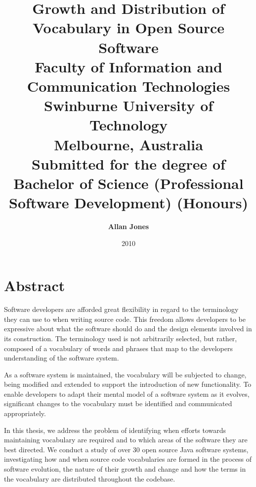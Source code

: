 \title{ \huge{\textbf{Growth and Distribution of Vocabulary in Open Source Software}} \\[1.2cm]
\large{Faculty of Information and Communication Technologies\\
Swinburne University of Technology\\
Melbourne, Australia\\}
\vspace{1.2cm} 
\large{Submitted for the degree of Bachelor of Science (Professional Software Development) (Honours)} \\
\vspace{1cm} 
} 
\author{ \Large{\textbf{Allan Jones}} } 
\date{2010} 
\maketitle

\newpage 
{}
\chapter*{Abstract}
\vspace{-0.75cm}

Software developers are afforded great flexibility in regard to the terminology they can use to when writing source code. This freedom allows developers to be expressive about what the software should do and the design elements involved in its construction. The terminology used is not arbitrarily selected, but rather, composed of a vocabulary of words and phrases that map to the developers understanding of the software system.

As a software system is maintained, the vocabulary will be subjected to change, being modified and extended to support the introduction of new functionality. To enable developers to adapt their mental model of a software system as it evolves, significant changes to the vocabulary must be identified and communicated appropriately.

In this thesis, we address the problem of identifying when efforts towards maintaining vocabulary are required and to which areas of the software they are best directed. We conduct a study of over 30 open source Java software systems, investigating how and when source code vocabularies are formed in the process of software evolution, the nature of their growth and change and how the terms in the vocabulary are distributed throughout the codebase.

